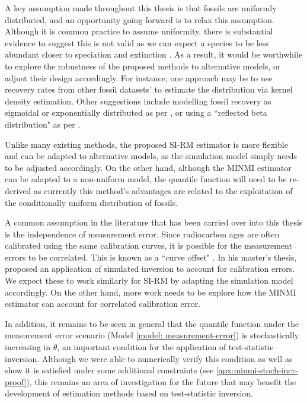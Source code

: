 A key assumption made throughout this thesis is that fossils are uniformly distributed, and an opportunity going forward is to relax this assumption. Although it is common practice to assume uniformity, there is substantial evidence to suggest this is not valid as we can expect a species to be less abundant closer to speciation and extinction \cite{Lee2010, WangMarshall2016}. As a result, it would be worthwhile to explore the robustness of the proposed methods to alternative models, or adjust their design accordingly. For instance, one approach may be to use recovery rates from other fossil datasets' to estimate the distribution via kernel density estimation. Other suggestions include modelling fossil recovery as sigmoidal or exponentially distributed as per \citet{Bradshaw2012}, or using a ``reflected beta distribution" as per \citet{Wang2016}.

Unlike many existing methods, the proposed SI-RM estimator is more flexible and can be adapted to alternative models, as the simulation model simply needs to be adjusted accordingly. On the other hand, although the MINMI estimator can be adapted to a non-uniform model, the quantile function will need to be re-derived as currently this method's advantages are related to the exploitation of the conditionally uniform distribution of fossils.

A common assumption in the literature that has been carried over into this thesis is the independence of measurement error. Since radiocarbon ages are often calibrated using the same calibration curves, it is possible for the measurement errors to be correlated. This is known as a ``curve offset" \cite{Ramsey2010}. In his master's thesis, \citet{King2020} proposed an application of simulated inversion to account for calibration errors. We expect these to work similarly for SI-RM by adapting the simulation model accordingly. On the other hand, more work needs to be explore how the MINMI estimator can account for correlated calibration error.

In addition, it remains to be seen in general that the quantile function under the measurement error scenario (Model \ref{model: measurement-error}) is stochastically increasing in $\theta$, an important condition for the application of test-statistic inversion. Although we were able to numerically verify this condition as well as show it is satisfied under some additional constraints (see \autoref{apx:minmi-stoch-incr-proof}), this remains an area of investigation for the future that may benefit the development of estimation methods based on test-statistic inversion.

